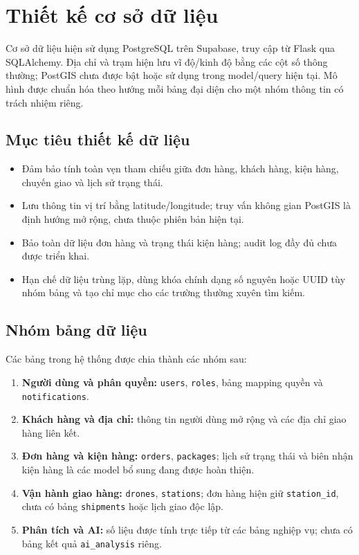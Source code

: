 \section{Thiết kế cơ sở dữ liệu}

Cơ sở dữ liệu hiện sử dụng PostgreSQL trên Supabase, truy cập từ Flask qua SQLAlchemy. Địa chỉ và trạm hiện lưu vĩ độ/kinh độ bằng các cột số thông thường; PostGIS chưa được bật hoặc sử dụng trong model/query hiện tại. Mô hình được chuẩn hóa theo hướng mỗi bảng đại diện cho một nhóm thông tin có trách nhiệm riêng.

\subsection{Mục tiêu thiết kế dữ liệu}

\begin{itemize}
	\item Đảm bảo tính toàn vẹn tham chiếu giữa đơn hàng, khách hàng, kiện hàng, chuyến giao và lịch sử trạng thái.
	\item Lưu thông tin vị trí bằng latitude/longitude; truy vấn không gian PostGIS là định hướng mở rộng, chưa thuộc phiên bản hiện tại.
	\item Bảo toàn dữ liệu đơn hàng và trạng thái kiện hàng; audit log đầy đủ chưa được triển khai.
	\item Hạn chế dữ liệu trùng lặp, dùng khóa chính dạng số nguyên hoặc UUID tùy nhóm bảng và tạo chỉ mục cho các trường thường xuyên tìm kiếm.
\end{itemize}

\subsection{Nhóm bảng dữ liệu}

Các bảng trong hệ thống được chia thành các nhóm sau:

\begin{enumerate}
	\item \textbf{Người dùng và phân quyền:} \texttt{users}, \texttt{roles}, bảng mapping quyền và \texttt{notifications}.
	\item \textbf{Khách hàng và địa chỉ:} thông tin người dùng mở rộng và các địa chỉ giao hàng liên kết.
	\item \textbf{Đơn hàng và kiện hàng:} \texttt{orders}, \texttt{packages}; lịch sử trạng thái và biên nhận kiện hàng là các model bổ sung đang được hoàn thiện.
	\item \textbf{Vận hành giao hàng:} \texttt{drones}, \texttt{stations}; đơn hàng hiện giữ \texttt{station\_id}, chưa có bảng \texttt{shipments} hoặc lịch giao độc lập.
	\item \textbf{Phân tích và AI:} số liệu được tính trực tiếp từ các bảng nghiệp vụ; chưa có bảng kết quả \texttt{ai\_analysis} riêng.
\end{enumerate}

